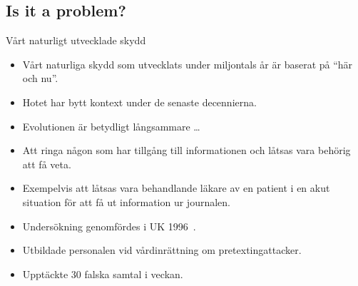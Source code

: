 \documentclass{beamer}
\begin{document}
\subsection{Is it a problem?}

\begin{frame}
  \begin{block}{Vårt naturligt utvecklade skydd}
    \begin{itemize}
      \item Vårt naturliga skydd som utvecklats under miljontals år är baserat på 
        \enquote{här och nu}.

      \item Hotet har bytt kontext under de senaste decennierna.

      \item Evolutionen är betydligt långsammare \dots

    \end{itemize}
  \end{block}
\end{frame}

\begin{frame}
  \begin{definition}[Pretexting]
    \begin{itemize}
      \item Att ringa någon som har tillgång till informationen och låtsas vara 
        behörig att få veta.

      \item Exempelvis att låtsas vara behandlande läkare av en patient i en akut 
        situation för att få ut information ur journalen.
    \end{itemize}
  \end{definition}
\end{frame}

\begin{frame}
  \begin{example}
    \begin{itemize}
      \item Undersökning genomfördes i UK 1996~\cite{Anderson2008sea}.
      \item Utbildade personalen vid vårdinrättning om pretextingattacker.
      \item Upptäckte 30 falska samtal i veckan.
    \end{itemize}
  \end{example}
\end{frame}
\end{document}
